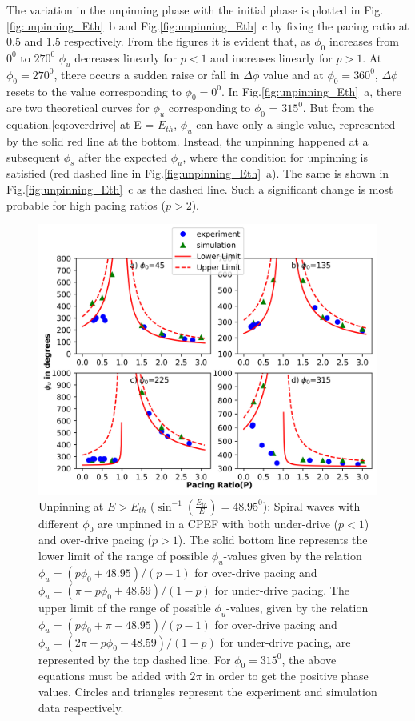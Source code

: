 \documentclass[%
 preprint,
 amsmath,amssymb,
 aps,
]{revtex4-2}
\begin{document}
The variation in the unpinning phase with the initial phase is plotted in Fig.\ref{fig:unpinning_Eth}~b and Fig.\ref{fig:unpinning_Eth}~c by fixing the pacing ratio at 0.5 and 1.5 respectively. From the figures it is evident that, as $\phi_0$ increases from $0^0$ to $270^0$ $\phi_{u}$ decreases linearly for $p<1$ and increases linearly for $p>1$. At $\phi_{0} = 270^0$, there occurs a sudden raise or fall in $\Delta\phi$ value and at $\phi_{0} = 360^0$, $\Delta\phi$ resets to the value corresponding to $\phi_{0} = 0^0$. In Fig.\ref{fig:unpinning_Eth}~a, there are two theoretical curves for $\phi_{u}$ corresponding to $\phi_{0}$ = $315^0$. But from the equation.\ref{eq:overdrive} at E = $E_{th}$, $\phi_{u}$ can have only a single value, represented by the solid red line at the bottom. Instead, the unpinning happened at a subsequent $\phi_{s}$ after the expected $\phi_{u}$, where the condition for unpinning is satisfied (red dashed line in Fig.\ref{fig:unpinning_Eth}~a). The same is shown in Fig.\ref{fig:unpinning_Eth}~c as the dashed line. Such a significant change is most probable for high pacing ratios ($p>2$). 
\begin{figure}[H]
    \centering
    \includegraphics{E>Eth.png}
    \caption{Unpinning at $E>E_{th}$ 
    (${\sin^{-1}}{(\frac{E_{th}}{E})}=48.95^0$): Spiral waves with different ${\phi}_0$ are unpinned in a CPEF with both under-drive ($p<1$) and over-drive pacing ($p>1$). The solid bottom line represents the lower limit of the range of possible ${\phi}_u$-values given by the relation
    ${\phi}_u=(p{\phi}_0+48.95)/(p-1)$ for over-drive pacing and ${\phi}_u=(\pi-p{\phi}_0+48.59)/(1-p)$ for under-drive pacing. The upper limit of the range of possible ${\phi}_u$-values, given by the relation ${\phi}_u=(p{\phi}_0+\pi-48.95)/(p-1)$ for over-drive pacing and ${\phi}_u=(2\pi-p{\phi}_0-48.59)/(1-p)$ for under-drive pacing, are represented by the top dashed line. For ${\phi}_0 = 315^0$, the above equations must be added with $2\pi$ in order to get the positive phase values.
    Circles and triangles represent the experiment and simulation data respectively. 
    }
    \label{fig:unpinning_E>Eth}
\end{figure}
\end{document}
